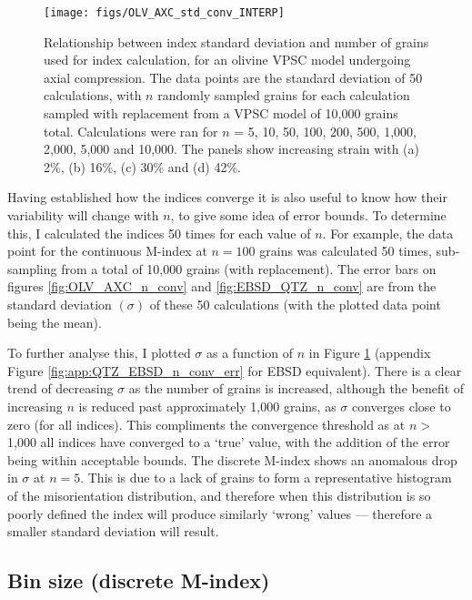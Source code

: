 \documentclass[a4paper,12pt,twoside]{report}
\numberwithin{equation}{chapter}
\begin{document}
      
\begin{figure}[h!]
  \centering
    \texttt{[image: figs/OLV\_AXC\_std\_conv\_INTERP]}
  \caption[Index error with no. grains (olivine)]{Relationship between index standard deviation and number of grains used for index calculation, for an olivine VPSC model undergoing axial compression. The data points are the standard deviation of 50 calculations, with $n$ randomly sampled grains for each calculation sampled with replacement from a VPSC model of 10,000 grains total. Calculations were ran for $n$ = 5, 10, 50, 100, 200, 500, 1,000, 2,000, 5,000 and 10,000. The panels show increasing strain with (a) 2\%, (b) 16\%, (c) 30\% and (d) 42\%.}
  \label{fig:OLV_AXC_n_conv_err}
\end{figure}


Having established how the indices converge it is also useful to know how their variability will change with $n$, to give some idea of error bounds. To determine this, I calculated the indices 50 times for each value of $n$. For example, the data point for the continuous M-index at $n = 100$ grains was calculated 50 times, sub-sampling from a total of 10,000 grains (with replacement). The error bars on figures \ref{fig:OLV_AXC_n_conv} and \ref{fig:EBSD_QTZ_n_conv} are from the standard deviation $(\sigma)$ of these 50 calculations (with the plotted data point being the mean).

To further analyse this, I plotted $\sigma$ as a function of $n$ in Figure \ref{fig:OLV_AXC_n_conv_err} (appendix Figure \ref{fig:app:QTZ_EBSD_n_conv_err} for EBSD equivalent). There is a clear trend of decreasing $\sigma$ as the number of grains is increased, although the benefit of increasing $n$ is reduced past approximately 1,000 grains, as $\sigma$ converges close to zero (for all indices). This compliments the convergence threshold as at $n >$ 1,000 all indices have converged to a \lq{}true\rq{} value, with the addition of the error being within acceptable bounds. The discrete M-index shows an anomalous drop in $\sigma$ at $n = 5$. This is due to a lack of grains to form a representative histogram of the misorientation distribution, and therefore when this distribution is so poorly defined the index will produce similarly \lq{}wrong\rq{} values --- therefore a smaller standard deviation will result.

\subsection{Bin size (discrete M-index)} \label{sec:bin_size}
\end{document}
